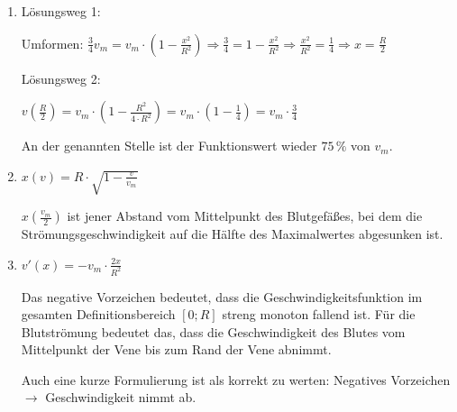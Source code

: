 \begin{langesbeispiel}
{\begin{enumerate}
	Außerdem setzt die Formel voraus, dass das Blutgefäß an jeder Stelle einen kreisförmigen Querschnitt mit einem konstanten Radius $R$ hat bzw. dass das Blutgefäß exakt zylinderförmig ist (Venen haben auch Venenklappen).
	
Schließlich strömt das Blut zeitlich nicht mit konstanter Geschwindigkeit,
 die Blutgeschwindigkeit verändert sich periodisch.

\item Lösungsweg 1:

Umformen: $\frac{3}{4}v_m=v_m\cdot\left(1-\frac{x^2}{R^2}\right)\Rightarrow\frac{3}{4}=1-\frac{x^2}{R^2}\Rightarrow\frac{x^2}{R^2}=\frac{1}{4}\Rightarrow x=\frac{R}{2}$

Lösungsweg 2:

$v\left(\frac{R}{2}\right)=v_m\cdot\left(1-\frac{R^2}{4\cdot R^2}\right)=v_m\cdot\left(1-\frac{1}{4}\right)=v_m\cdot \frac{3}{4}$

An der genannten Stelle ist der Funktionswert wieder $75\,\%$ von $v_m$.

\item $x(v)=R\cdot\sqrt{1-\frac{v}{v_m}}$

$x\left(\frac{v_m}{2}\right)$ ist jener Abstand vom Mittelpunkt des Blutgefäßes, bei dem die Strömungsgeschwindigkeit auf die Hälfte des Maximalwertes abgesunken ist.

\item $v'(x)=-v_m\cdot \frac{2x}{R^2}$

Das negative Vorzeichen bedeutet, dass die Geschwindigkeitsfunktion
 im gesamten Definitionsbereich $[0;R]$ streng monoton fallend ist. Für die Blutströmung bedeutet das, dass die Geschwindigkeit des Blutes vom Mittelpunkt der Vene bis zum Rand der Vene abnimmt.

Auch eine kurze Formulierung ist als korrekt zu werten: Negatives Vorzeichen 
$\rightarrow$ Geschwindigkeit nimmt ab.
	\end{enumerate}}
		\end{langesbeispiel}